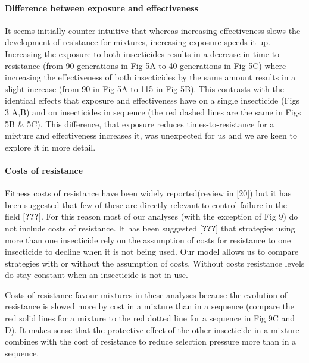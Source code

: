 \documentclass[11pt,]{article}
\let\oldparagraph\paragraph
\renewcommand{\paragraph}[1]{\oldparagraph{#1}\mbox{}}
\begin{document}
\paragraph{Difference between exposure and
effectiveness}\label{difference-between-exposure-and-effectiveness}

It seems initially counter-intuitive that whereas increasing
effectiveness slows the development of resistance for mixtures,
increasing exposure speeds it up. Increasing the exposure to both
insecticides results in a decrease in time-to-resistance (from 90
generations in Fig 5A to 40 generations in Fig 5C) where increasing the
effectiveness of both insecticides by the same amount results in a
slight increase (from 90 in Fig 5A to 115 in Fig 5B). This contrasts
with the identical effects that exposure and effectiveness have on a
single insecticide (Figs 3 A,B) and on insecticides in sequence (the red
dashed lines are the same in Figs 5B \& 5C). This difference, that
exposure reduces times-to-resistance for a mixture and effectiveness
increases it, was unexpected for us and we are keen to explore it in
more detail.

\paragraph{Costs of resistance}\label{costs-of-resistance-1}

Fitness costs of resistance have been widely reported(review in
{[}20{]}) but it has been suggested that few of these are directly
relevant to control failure in the field {[}{\textbf{???}}{]}. For this
reason most of our analyses (with the exception of Fig 9) do not include
costs of resistance. It has been suggested {[}{\textbf{???}}{]} that
strategies using more than one insecticide rely on the assumption of
costs for resistance to one insecticide to decline when it is not being
used. Our model allows us to compare strategies with or without the
assumption of costs. Without costs resistance levels do stay constant
when an insecticide is not in use.

Costs of resistance favour mixtures in these analyses because the
evolution of resistance is slowed more by cost in a mixture than in a
sequence (compare the red solid lines for a mixture to the red dotted
line for a sequence in Fig 9C and D). It makes sense that the protective
effect of the other insecticide in a mixture combines with the cost of
resistance to reduce selection pressure more than in a sequence.
\end{document}
